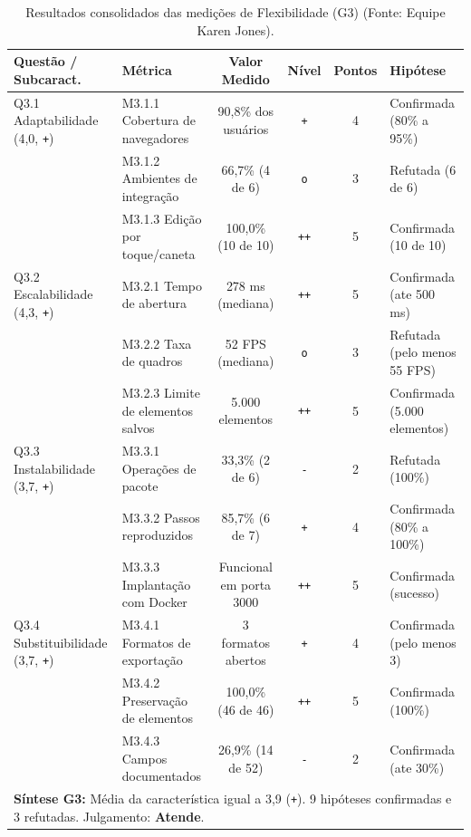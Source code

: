 \documentclass[12pt]{article}
\renewcommand{\arraystretch}{0.9}
\begin{document}
\begin{table}[!ht]
\centering
\caption{Resultados consolidados das medições de Flexibilidade (G3) (Fonte: Equipe Karen Jones).}
\label{tab:resultados_g3}
\vspace{2pt}
\scriptsize
\setlength{\tabcolsep}{2.5pt}
\renewcommand{\arraystretch}{0.85}
\begin{tabular}{llcccl}
\toprule
\textbf{Questão / Subcaract.} & \textbf{Métrica} & \textbf{Valor Medido} & \textbf{Nível} & \textbf{Pontos} & \textbf{Hipótese} \\
\midrule
Q3.1 Adaptabilidade (4,0, \texttt{+}) & M3.1.1 Cobertura de navegadores & 90,8\% dos usuários & \texttt{+} & 4 & Confirmada (80\% a 95\%) \\
 & M3.1.2 Ambientes de integração & 66,7\% (4 de 6) & \texttt{o} & 3 & Refutada (6 de 6) \\
 & M3.1.3 Edição por toque/caneta & 100,0\% (10 de 10) & \texttt{++} & 5 & Confirmada (10 de 10) \\
\midrule
Q3.2 Escalabilidade (4,3, \texttt{+}) & M3.2.1 Tempo de abertura & 278 ms (mediana) & \texttt{++} & 5 & Confirmada (ate 500 ms) \\
 & M3.2.2 Taxa de quadros & 52 FPS (mediana) & \texttt{o} & 3 & Refutada (pelo menos 55 FPS) \\
 & M3.2.3 Limite de elementos salvos & 5.000 elementos & \texttt{++} & 5 & Confirmada (5.000 elementos) \\
\midrule
Q3.3 Instalabilidade (3,7, \texttt{+}) & M3.3.1 Operações de pacote & 33,3\% (2 de 6) & \texttt{-} & 2 & Refutada (100\%) \\
 & M3.3.2 Passos reproduzidos & 85,7\% (6 de 7) & \texttt{+} & 4 & Confirmada (80\% a 100\%) \\
 & M3.3.3 Implantação com Docker & Funcional em porta 3000 & \texttt{++} & 5 & Confirmada (sucesso) \\
\midrule
Q3.4 Substituibilidade (3,7, \texttt{+}) & M3.4.1 Formatos de exportação & 3 formatos abertos & \texttt{+} & 4 & Confirmada (pelo menos 3) \\
 & M3.4.2 Preservação de elementos & 100,0\% (46 de 46) & \texttt{++} & 5 & Confirmada (100\%) \\
 & M3.4.3 Campos documentados & 26,9\% (14 de 52) & \texttt{-} & 2 & Confirmada (ate 30\%) \\
\midrule
\multicolumn{6}{p{14.6cm}}{\textbf{Síntese G3:} Média da característica igual a 3,9 (\texttt{+}). 9 hipóteses confirmadas e 3 refutadas. Julgamento: \textbf{Atende}.} \\
\bottomrule
\end{tabular}
\end{table}
\end{document}

